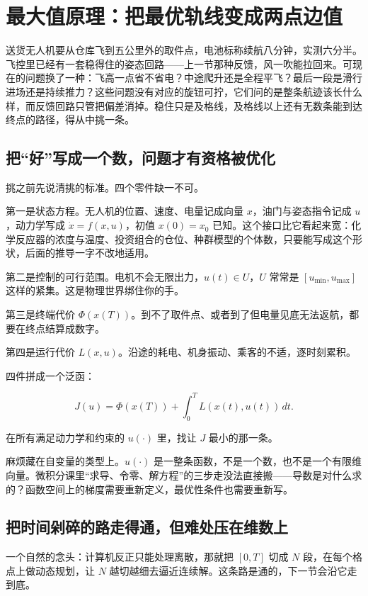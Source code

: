 \section{最大值原理：把最优轨线变成两点边值}
\label{sec:16-Control-and-Reinforcement-Learning/01-Optimal-Control/02}

送货无人机要从仓库飞到五公里外的取件点，电池标称续航八分钟，实测六分半。飞控里已经有一套稳得住的姿态回路——上一节那种反馈，风一吹能拉回来。可现在的问题换了一种：飞高一点省不省电？中途爬升还是全程平飞？最后一段是滑行进场还是持续推力？这些问题没有对应的旋钮可拧，它们问的是整条航迹该长什么样，而反馈回路只管把偏差消掉。稳住只是及格线，及格线以上还有无数条能到达终点的路径，得从中挑一条。

\subsection{把``好''写成一个数，问题才有资格被优化}

挑之前先说清挑的标准。四个零件缺一不可。

第一是状态方程。无人机的位置、速度、电量记成向量 \(x\)，油门与姿态指令记成 \(u\)，动力学写成 \(\dot x = f(x,u)\)，初值 \(x(0)=x_0\) 已知。这个接口比它看起来宽：化学反应器的浓度与温度、投资组合的仓位、种群模型的个体数，只要能写成这个形状，后面的推导一字不改地适用。

第二是控制的可行范围。电机不会无限出力，\(u(t)\in U\)，\(U\) 常常是 \([u_{\min},u_{\max}]\) 这样的紧集。这是物理世界绑住你的手。

第三是终端代价 \(\Phi(x(T))\)。到不了取件点、或者到了但电量见底无法返航，都要在终点结算成数字。

第四是运行代价 \(L(x,u)\)。沿途的耗电、机身振动、乘客的不适，逐时刻累积。

四件拼成一个泛函：

\[
J(u) = \Phi(x(T)) + \int_0^T L(x(t),u(t))\, dt.
\]

在所有满足动力学和约束的 \(u(\cdot)\) 里，找让 \(J\) 最小的那一条。

麻烦藏在自变量的类型上。\(u(\cdot)\) 是一整条函数，不是一个数，也不是一个有限维向量。微积分课里``求导、令零、解方程''的三步走没法直接搬——导数是对什么求的？函数空间上的梯度需要重新定义，最优性条件也需要重新写。

\subsection{把时间剁碎的路走得通，但难处压在维数上}

一个自然的念头：计算机反正只能处理离散，那就把 \([0,T]\) 切成 \(N\) 段，在每个格点上做动态规划，让 \(N\) 越切越细去逼近连续解。这条路是通的，下一节会沿它走到底。


